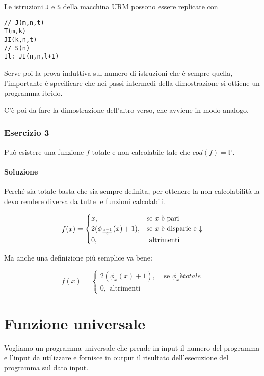 Le istruzioni \texttt{J} e \texttt{S} della macchina URM possono essere replicate con 

\begin{lstlisting}[language=URM]
// J(m,n,t)
T(m,k)
JI(k,n,t)
// S(n)
Il: JI(n,n,l+1)
\end{lstlisting}

Serve poi la prova induttiva sul numero di istruzioni che è sempre quella, l'importante è specificare che nei passi intermedi della dimostrazione si ottiene un programma ibrido.

C'è poi da fare la dimostrazione dell'altro verso, che avviene in modo analogo.

\subsection{Esercizio 3}

Può esistere una funzione $ f $ totale e non calcolabile tale che $ cod(f) = \mathbb{P} $.

\subsubsection{Soluzione}

Perché sia totale basta che sia sempre definita, per ottenere la non calcolabilità la devo rendere diversa da tutte le funzioni calcolabili.

$$
f(x) = \begin{cases}
x, &\text{se $ x $ è pari}\\
2(\phi_{\frac{x-1}{2}}(x) +1), &\text{se $ x $ è disparie e $ \downarrow $} \\
0, &\text{ altrimenti}
\end{cases}
$$

Ma anche una definizione più semplice va bene:

$$
f(x) = \begin{cases}
2 (\phi_x(x) +1), &\text{ se }\phi_x { è totale} \\
0, \text{ altrimenti}
\end{cases}
$$

\chapter{Funzione universale}

Vogliamo un programma universale che prende in input il numero del programma e l'input da utilizzare e fornisce in output il risultato dell'esecuzione del programma sul dato input.

